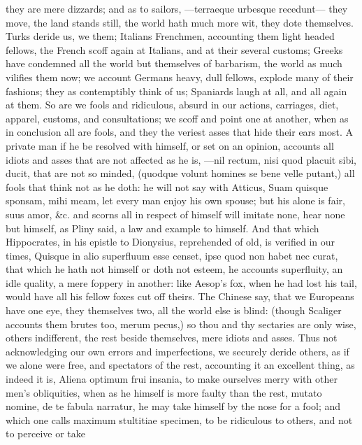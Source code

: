 {they are mere dizzards; and as to sailors, ---terraeque urbesque
recedunt--- they move, the land stands still, the world hath much more
wit, they dote themselves. Turks deride us, we them; Italians
Frenchmen, accounting them light headed fellows, the French scoff again
at Italians, and at their several customs; Greeks have condemned all
the world but themselves of barbarism, the world as much vilifies them
now; we account Germans heavy, dull fellows, explode many of their
fashions; they as contemptibly think of us; Spaniards laugh at all, and
all again at them. So are we fools and ridiculous, absurd in our
actions, carriages, diet, apparel, customs, and consultations; we 
scoff and point one at another, when as in conclusion all are fools,
 and they the veriest asses that hide their ears most. A private
man if he be resolved with himself, or set on an opinion, accounts all
idiots and asses that are not affected as he is, ---nil rectum,
nisi quod placuit sibi, ducit, that are not so minded, (quodque
volunt homines se bene velle putant,) all fools that think not as he
doth: he will not say with Atticus, Suam quisque sponsam, mihi meam,
let every man enjoy his own spouse; but his alone is fair, suus amor,
\&c. and scorns all in respect of himself will imitate none, hear
none but himself, as Pliny said, a law and example to himself. And
that which Hippocrates, in his epistle to Dionysius, reprehended of
old, is verified in our times, Quisque in alio superfluum esse censet,
ipse quod non habet nec curat, that which he hath not himself or doth
not esteem, he accounts superfluity, an idle quality, a mere foppery in
another: like Aesop's fox, when he had lost his tail, would have all
his fellow foxes cut off theirs. The Chinese say, that we Europeans
have one eye, they themselves two, all the world else is blind: (though
Scaliger accounts them brutes too, merum pecus,) so thou and thy
sectaries are only wise, others indifferent, the rest beside
themselves, mere idiots and asses. Thus not acknowledging our own
errors and imperfections, we securely deride others, as if we alone
were free, and spectators of the rest, accounting it an excellent
thing, as indeed it is, Aliena optimum frui insania, to make ourselves
merry with other men's obliquities, when as he himself is more faulty
than the rest, mutato nomine, de te fabula narratur, he may take
himself by the nose for a fool; and which one calls maximum stultitiae
specimen, to be ridiculous to others, and not to perceive or take
}
